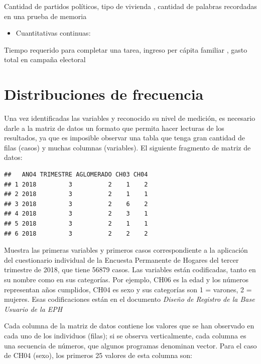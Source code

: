 \documentclass[]{book}
\providecommand{\tightlist}{%
  \setlength{\itemsep}{0pt}\setlength{\parskip}{0pt}}
\begin{document}
Cantidad de partidos políticos, tipo de vivienda \citet{INDEC2018}, cantidad de palabras recordadas en una prueba de memoria

\begin{itemize}
\tightlist
\item
  Cuantitativas continuas:
\end{itemize}

Tiempo requerido para completar una tarea, ingreso per cápita familiar \citet{INDEC2018}, gasto total en campaña electoral \citet{MoralesQuiroga2010}

\hypertarget{distribuciones-de-frecuencia}{%
\chapter{Distribuciones de frecuencia}\label{distribuciones-de-frecuencia}}

Una vez identificadas las variables y reconocido su nivel de medición, es necesario darle a la matriz de datos un formato que permita hacer lecturas de los resultados, ya que es imposible observar una tabla que tenga gran cantidad de filas (casos) y muchas columnas (variables).
El siguiente fragmento de matriz de datos:

\begin{verbatim}
##   ANO4 TRIMESTRE AGLOMERADO CH03 CH04
## 1 2018         3          2    1    2
## 2 2018         3          2    1    1
## 3 2018         3          2    6    2
## 4 2018         3          2    3    1
## 5 2018         3          2    1    1
## 6 2018         3          2    2    2
\end{verbatim}

Muestra las primeras variables y primeros casos correspondiente a la aplicación del cuestionario individual de la Encuesta Permanente de Hogares \citet{INDEC2018} del tercer trimestre de 2018, que tiene 56879 casos. Las variables están codificadas, tanto en su nombre como en sus categorías. Por ejemplo, CH06 es la edad y los números representan años cumplidos, CH04 es sexo y sus categorías son 1 = varones, 2 = mujeres. Esas codificaciones están en el documento \emph{Diseño de Registro de la Base Usuario de la EPH} \citet{INDEC2009}

Cada columna de la matriz de datos contiene los valores que se han observado en cada uno de los individuos (filas); si se observa verticalmente, cada columna es una secuencia de números, que algunos programas denominan vector. Para el caso de CH04 (sexo), los primeros 25 valores de esta columna son:
\end{document}
